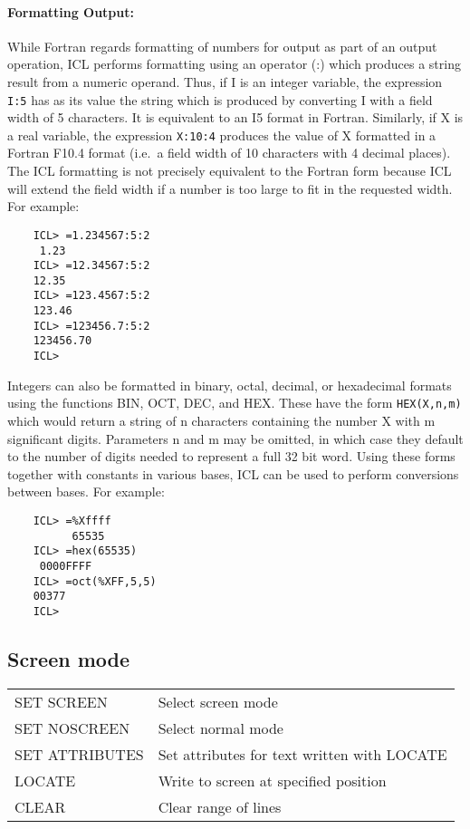 \paragraph{Formatting Output:}\hfill

While Fortran regards formatting of numbers for output as part of an output
operation, ICL performs formatting using an operator (:) which produces a string
result from a numeric operand.
Thus, if I is an integer variable, the expression \verb+I:5+ has as its value
the string which is produced by converting I with a field width of 5 characters.
It is equivalent to an I5 format in Fortran.
Similarly, if X is a real variable, the expression \verb+X:10:4+ produces the
value of X formatted in a Fortran F10.4 format (i.e.\ a field width of 10
characters with 4 decimal places).
The ICL formatting is not precisely equivalent to the Fortran form because ICL
will extend the field width if a number is too large to fit in the requested
width.
For example:

\begin{small}
\begin{verbatim}
    ICL> =1.234567:5:2
     1.23
    ICL> =12.34567:5:2
    12.35
    ICL> =123.4567:5:2
    123.46
    ICL> =123456.7:5:2
    123456.70
    ICL>
\end{verbatim}
\end{small}

Integers can also be formatted in binary, octal, decimal, or hexadecimal formats
using the functions BIN, OCT, DEC, and HEX.
These have the form \verb+HEX(X,n,m)+ which would return a string of n
characters containing the number X with m significant digits.
Parameters n and m may be omitted, in which case they default to the number of
digits needed to represent a full 32 bit word.
Using these forms together with constants in various bases, ICL can be used to
perform conversions between bases.
For example:

\begin{small}
\begin{verbatim}
    ICL> =%Xffff
          65535
    ICL> =hex(65535)
     0000FFFF
    ICL> =oct(%XFF,5,5)
    00377
    ICL>
\end{verbatim}
\end{small}

\subsection{Screen mode}

\begin{center}
\begin{tabular}{|l|l|}
\hline
SET SCREEN    & Select screen mode \\
SET NOSCREEN  & Select normal mode \\
SET ATTRIBUTES & Set attributes for text written with LOCATE \\
\hline
LOCATE         & Write to screen at specified position \\
CLEAR          & Clear range of lines \\
\hline
\end{tabular}
\end{center}

